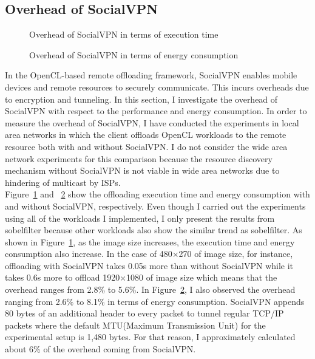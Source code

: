 \subsection{Overhead of SocialVPN}
\label{offloading:overhead_socialvpn}
%
\begin{figure}
\centering
{}
\caption{Overhead of SocialVPN in terms of execution time}
\label{fig:overhead_socialvpn1}
\end{figure}
%
\begin{figure}
\centering
{}
\caption{Overhead of SocialVPN in terms of energy consumption}
\label{fig:overhead_socialvpn2}
\end{figure}
%
In the OpenCL-based remote offloading framework, SocialVPN enables
mobile devices and remote resources to securely communicate.
%
This incurs overheads due to encryption and tunneling.
%
In this section, I investigate the overhead of SocialVPN with respect to
the performance and energy consumption.
%
In order to measure the overhead of SocialVPN, I have conducted the
experiments in local area networks in which the client offloads OpenCL
workloads to the remote resource both with and without SocialVPN.
%
I do not consider the wide area network experiments for this comparison
because the resource discovery mechanism without SocialVPN is not viable
in wide area networks due to hindering of multicast by ISPs.\\
%
Figure~\ref{fig:overhead_socialvpn1} and ~\ref{fig:overhead_socialvpn2}
show the offloading execution time and energy consumption with and
without SocialVPN, respectively.
%
Even though I carried out the experiments using all of the workloads
I implemented, I only present the results from sobelfilter because
other workloads also show the similar trend as sobelfilter.
%
As shown in Figure~\ref{fig:overhead_socialvpn1}, as the image size
increases, the execution time and energy consumption also increase.
%
In the case of 480$\times$270 of image size, for instance, offloading with
SocialVPN takes 0.05s more than without SocialVPN while it takes 0.6s
more to offload 1920$\times$1080 of image size which means that the
overhead ranges from 2.8\% to 5.6\%.
%
In Figure~\ref{fig:overhead_socialvpn2}, I also observed the overhead
ranging from 2.6\% to 8.1\% in terms of energy consumption.
%
SocialVPN appends 80 bytes of an additional header to every packet to
tunnel regular TCP/IP packets where the default MTU(Maximum Transmission
Unit) for the experimental setup is 1,480 bytes.
%
For that reason, I approximately calculated about 6\% of the overhead
coming from SocialVPN.
%

